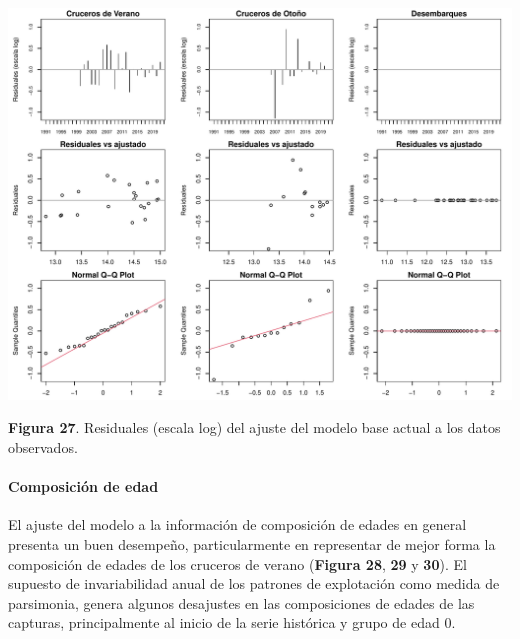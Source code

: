 \documentclass[
  spanish,
]{article}
\begin{document}
\begin{center}\includegraphics{FigurasInforme_Marzo/Fig27_ajusteBcruReclas-1} \end{center}

\vspace{-0.5cm}
\small

\textbf{Figura 27}. Residuales (escala log) del ajuste del modelo base
actual a los datos observados. \vspace{0.5cm} \normalsize

\pagebreak

\hypertarget{composiciuxf3n-de-edad}{%
\paragraph{Composición de edad}\label{composiciuxf3n-de-edad}}

\quad

El ajuste del modelo a la información de composición de edades en
general presenta un buen desempeño, particularmente en representar de
mejor forma la composición de edades de los cruceros de verano
(\textbf{Figura 28}, \textbf{29} y \textbf{30}). El supuesto de
invariabilidad anual de los patrones de explotación como medida de
parsimonia, genera algunos desajustes en las composiciones de edades de
las capturas, principalmente al inicio de la serie histórica y grupo de
edad 0.
\end{document}
